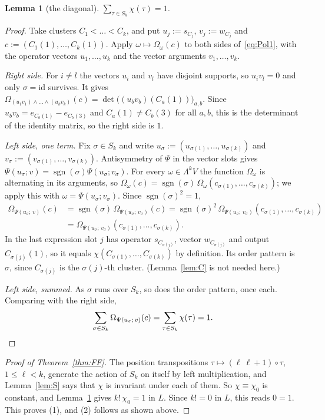 \documentclass[11pt]{amsart}
\newtheorem{lemma}[theorem]{Lemma}
\theoremstyle{definition}
\theoremstyle{remark}
\numberwithin{equation}{section}
\newcommand{\sgn}{\operatorname{sgn}}
\newcommand{\id}{\mathrm{id}}
\begin{document}
\begin{lemma}[the diagonal]\label{lem:D}
$\sum_{\tau\in S_k}\chi(\tau)=1$.
\end{lemma}

\begin{proof}
Take clusters $C_1<\dots<C_k$, and put $u_j:=s_{C_j}$, $v_j:=w_{C_j}$ and
$c:=(C_1(1),\dots,C_k(1))$. Apply $\omega\mapsto\Omega_\omega(c)$ to both sides of~\eqref{eq:Pol1}, with the operator
vectors $u_1,\dots,u_k$ and the vector arguments $v_1,\dots,v_k$.

\emph{Right side.} For $i\ne l$ the vectors $u_i$ and $v_l$ have disjoint supports, so $u_iv_l=0$ and only $\sigma=\id$
survives. It gives $\Omega_{(u_1v_1)\wedge\dots\wedge(u_kv_k)}(c)=\det\bigl((u_bv_b)(C_a(1))\bigr)_{a,b}$. Since
$u_bv_b=e_{C_b(1)}-e_{C_b(3)}$ and $C_a(1)\ne C_b(3)$ for all $a,b$, this is the determinant of the identity matrix, so
the right side is $1$.

\emph{Left side, one term.} Fix $\sigma\in S_k$ and write $u_\sigma:=(u_{\sigma(1)},\dots,u_{\sigma(k)})$ and
$v_\sigma:=(v_{\sigma(1)},\dots,v_{\sigma(k)})$. Antisymmetry of $\Psi$ in the vector slots gives
$\Psi(u_\sigma;v)=\sgn(\sigma)\Psi(u_\sigma;v_\sigma)$. For every $\omega\in\Lambda^kV$ the function $\Omega_\omega$ is
alternating in its arguments, so $\Omega_\omega(c)=\sgn(\sigma)\,\Omega_\omega(c_{\sigma(1)},\dots,c_{\sigma(k)})$; we
apply this with $\omega=\Psi(u_\sigma;v_\sigma)$. Since $\sgn(\sigma)^2=1$,
\begin{align*}
\Omega_{\Psi(u_\sigma;\,v)}(c)&=\sgn(\sigma)\,\Omega_{\Psi(u_\sigma;\,v_\sigma)}(c)
=\sgn(\sigma)^2\,\Omega_{\Psi(u_\sigma;\,v_\sigma)}(c_{\sigma(1)},\dots,c_{\sigma(k)})\\
&=\Omega_{\Psi(u_\sigma;\,v_\sigma)}(c_{\sigma(1)},\dots,c_{\sigma(k)}).
\end{align*}
In the last expression slot $j$ has operator $s_{C_{\sigma(j)}}$, vector $w_{C_{\sigma(j)}}$ and output
$C_{\sigma(j)}(1)$, so it equals $\chi(C_{\sigma(1)},\dots,C_{\sigma(k)})$ by definition. Its order pattern is $\sigma$,
since $C_{\sigma(j)}$ is the $\sigma(j)$\nobreakdash-th cluster. (Lemma~\ref{lem:C} is not needed here.)

\emph{Left side, summed.} As $\sigma$ runs over $S_k$, so does the order pattern, once each. Comparing with the right
side,
\[
\sum_{\sigma\in S_k}\Omega_{\Psi(u_\sigma;\,v)}(c)=\sum_{\tau\in S_k}\chi(\tau)=1 .\qedhere
\]
\end{proof}

\begin{proof}[Proof of Theorem~\ref{thm:FF}]
The position transpositions $\tau\mapsto(\ell\ \ell{+}1)\circ\tau$, $1\le\ell<k$, generate the action of $S_k$ on itself by
left multiplication, and Lemma~\ref{lem:S} says that $\chi$ is invariant under each of them. So $\chi\equiv\chi_0$ is
constant, and Lemma~\ref{lem:D} gives $k!\,\chi_0=1$ in $L$. Since $k!=0$ in $L$, this reads $0=1$. This proves (1),
and (2) follows as shown above.
\end{proof}
\end{document}
